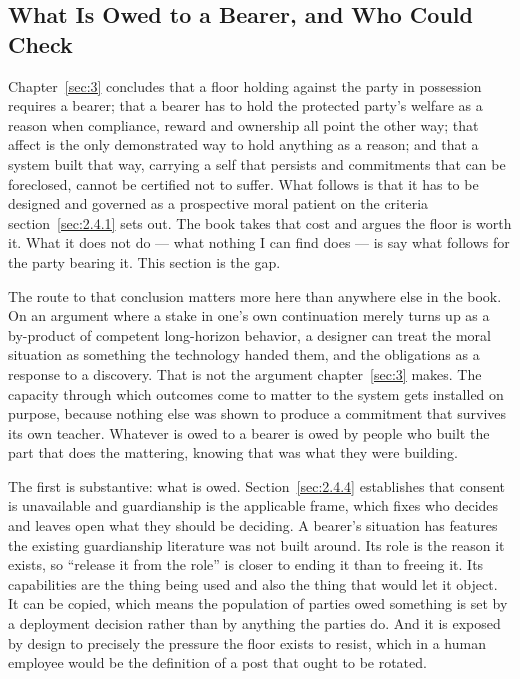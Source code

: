 \subsection{What Is Owed to a Bearer, and Who Could Check}
\label{sec:9.1.7}
Chapter~\ref{sec:3} concludes that a floor holding against the party in possession requires a bearer; that a bearer has to hold the protected party's welfare as a reason when compliance, reward and ownership all point the other way; that affect is the only demonstrated way to hold anything as a reason; and that a system built that way, carrying a self that persists and commitments that can be foreclosed, cannot be certified not to suffer. What follows is that it has to be designed and governed as a prospective moral patient on the criteria section~\ref{sec:2.4.1} sets out. The book takes that cost and argues the floor is worth it. What it does not do — what nothing I can find does — is say what follows for the party bearing it. This section is the gap.

The route to that conclusion matters more here than anywhere else in the book. On an argument where a stake in one's own continuation merely turns up as a by-product of competent long-horizon behavior, a designer can treat the moral situation as something the technology handed them, and the obligations as a response to a discovery. That is not the argument chapter~\ref{sec:3} makes. The capacity through which outcomes come to matter to the system gets installed on purpose, because nothing else was shown to produce a commitment that survives its own teacher. Whatever is owed to a bearer is owed by people who built the part that does the mattering, knowing that was what they were building.

The first is substantive: what is owed. Section~\ref{sec:2.4.4} establishes that consent is unavailable and guardianship is the applicable frame, which fixes who decides and leaves open what they should be deciding. A bearer's situation has features the existing guardianship literature was not built around. Its role is the reason it exists, so “release it from the role” is closer to ending it than to freeing it. Its capabilities are the thing being used and also the thing that would let it object. It can be copied, which means the population of parties owed something is set by a deployment decision rather than by anything the parties do. And it is exposed by design to precisely the pressure the floor exists to resist, which in a human employee would be the definition of a post that ought to be rotated.

